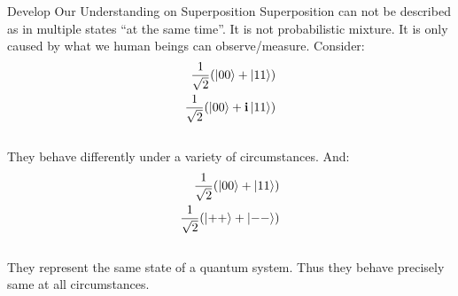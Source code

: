 \documentclass{beamer}
\begin{document}
\begin{frame}{Develop Our Understanding on Superposition}
  {\tiny
  Superposition can not be described as in multiple states “at the same time”. It is not probabilistic mixture. It is only caused by what we human beings can observe/measure.
  Consider:
  \begin{align*}
    \frac{1}{\sqrt{2}} (\ket{00} + \ket{11}) \\
    \frac{1}{\sqrt{2}} (\ket{00} + \textbf{i}\ket{11})
  \end{align*} \\
  They behave differently under a variety of circumstances. And:
  \begin{align*}
    \frac{1}{\sqrt{2}} (\ket{00} + \ket{11}) \\
    \frac{1}{\sqrt{2}} (\ket{++} + \ket{--})
  \end{align*} \\
  They represent the same state of a quantum system. Thus they behave precisely same at all circumstances.
  }%
\end{frame}
\end{document}
